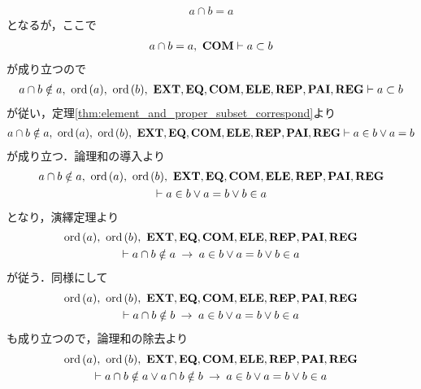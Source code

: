 \begin{sketch}
\begin{description}
\begin{align}
					a \cap b = a
				\end{align}
				となるが，ここで
				\begin{align}
					a \cap b = a,\ \mbox{\bf COM} \vdash a \subset b
				\end{align}
				が成り立つので
				\begin{align}
					a \cap b \notin a,\ \ord{a},\ \ord{b},\ \EXTAX,\EQAX,\COMAX,\ELEAX,\REPAX,\PAIAX,\REGAX \vdash 
					a \subset b
				\end{align}
				が従い，定理\ref{thm:element_and_proper_subset_correspond}より
				\begin{align}
					a \cap b \notin a,\ \ord{a},\ \ord{b},\ \EXTAX,\EQAX,\COMAX,\ELEAX,\REPAX,\PAIAX,\REGAX \vdash 
					a \in b \vee a = b
				\end{align}
				が成り立つ．論理和の導入より
				\begin{align}
					\begin{gathered}
						a \cap b \notin a,\ \ord{a},\ \ord{b},\ \EXTAX,\EQAX,\COMAX,\ELEAX,\REPAX,\PAIAX,\REGAX \\
						\vdash a \in b \vee a = b \vee b \in a
					\end{gathered}
				\end{align}
				となり，演繹定理より
				\begin{align}
					\begin{gathered}
						\ord{a},\ \ord{b},\ \EXTAX,\EQAX,\COMAX,\ELEAX,\REPAX,\PAIAX,\REGAX \\
						\vdash a \cap b \notin a \rarrow a \in b \vee a = b \vee b \in a
					\end{gathered}
				\end{align}
				が従う．同様にして
				\begin{align}
					\begin{gathered}
						\ord{a},\ \ord{b},\ \EXTAX,\EQAX,\COMAX,\ELEAX,\REPAX,\PAIAX,\REGAX \\
						\vdash a \cap b \notin b \rarrow a \in b \vee a = b \vee b \in a
					\end{gathered}
				\end{align}
				も成り立つので，論理和の除去より
				\begin{align}
					\begin{gathered}
						\ord{a},\ \ord{b},\ \EXTAX,\EQAX,\COMAX,\ELEAX,\REPAX,\PAIAX,\REGAX \\
						\vdash 
						a \cap b \notin a \vee a \cap b \notin b
						\rarrow a \in b \vee a = b \vee b \in a
					\end{gathered}

\end{align}
\end{description}
\end{sketch}

